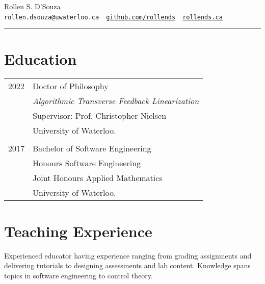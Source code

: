 \documentclass[oneside, 10pt]{memoir}
\begin{document}
\newcommand{\entryGeneral}[4]{
    \textbf{#2} \sourceatright{#1}
    \emph{#3}
    \begin{adjustwidth}{1em}{0em}
        #4
    \end{adjustwidth}
    \hfill
}

\newcommand{\entrySimple}[3]{
    \textbf{#2} \sourceatright{#1}
    \begin{adjustwidth}{1em}{0em}
        #3
    \end{adjustwidth}
    \hfill
}

%
\LARGE{{Rollen S. D'Souza}}\\
\small{\texttt{rollen.dsouza@uwaterloo.ca}~\textbullet~\href{https://github.com/rollends}{\texttt{github.com/rollends}}~\textbullet~\href{https://rollends.ca}{\texttt{rollends.ca}} }\\
\rule{\linewidth}{0.4pt}

\section*{Education}

\begin{tabular}{ll}
    {2022}
        & Doctor of Philosophy\\
        & \emph{Algorithmic Transverse Feedback Linearization}\\
        & Supervisor: Prof. Christopher Nielsen\\
        & University of Waterloo.\\
        & \\
    {2017}
        & Bachelor of Software Engineering\\
        & Honours Software Engineering\\
        & Joint Honours Applied Mathematics\\
        & University of Waterloo.
\end{tabular}

\section*{Teaching Experience}
Experienced educator having experience ranging from grading assignments and delivering tutorials to designing assessments and lab content.
Knowledge spans topics in software engineering to control theory.
\end{document}
